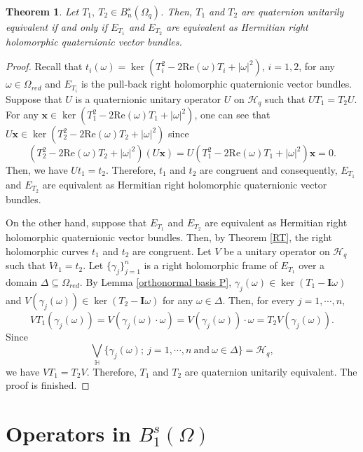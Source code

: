 \documentclass[pdflatex,sn-mathphys-num]{sn-jnl}%
\theoremstyle{thmstyleone}%
\newtheorem{theorem}{Theorem}%
\theoremstyle{thmstyletwo}%
\theoremstyle{thmstylethree}%
\newtheorem{theorem}{Theorem}[section]
\theoremstyle{definition}
\theoremstyle{remark}
\begin{document}
    \begin{theorem}\label{MT}
	Let $T_1,\ T_2\in B_n^{s}(\Omega_q)$. Then, $T_1$ and $T_2$ are quaternion unitarily equivalent if and only if $E_{T_1}$ and $E_{T_2}$ are equivalent as Hermitian right holomorphic quaternionic vector bundles.
	\end{theorem}
    \begin{proof}
    Recall that $t_i(\omega)=\ker(T_i^2-2\mathrm{Re}(\omega)T_i+|\omega|^2)$, $i=1, 2$, for any $\omega\in\Omega_{red}$ and $E_{T_i}$ is the pull-back right holomorphic quaternionic vector bundles. Suppose that $U$ is a  quaternionic unitary operator $U$ on $\mathcal{H}_q$ such that
    $UT_1=T_2U$. For any $\boldsymbol{x}\in\ker(T_1^2-2\mathrm{Re}(\omega)T_1+|\omega|^2)$, one can see that $U\boldsymbol{x}\in\ker(T_2^2-2\mathrm{Re}(\omega)T_2+|\omega|^2)$ since
    $$
     (T_2^2-2\mathrm{Re}(\omega)T_2+|\omega|^2)(U\boldsymbol{x})
    =  U(T_1^2-2\mathrm{Re}(\omega)T_1+|\omega|^2)\boldsymbol{x}
    =  0.
    $$
    Then, we have $Ut_1=t_2$. Therefore, $t_1$ and $t_2$ are congruent and consequently, $E_{T_1}$ and $E_{T_2}$ are equivalent as Hermitian right holomorphic quaternionic vector bundles.


    On the other hand, suppose that $E_{T_1}$ and $E_{T_2}$ are equivalent as Hermitian right holomorphic quaternionic vector bundles. Then, by Theorem \ref{RT}, the right holomorphic curves $t_1$ and $t_2$ are congruent. Let $V$ be a unitary operator on $\mathcal{H}_q$ such that $Vt_1=t_2$. Let
    $\{\gamma_j\}_{j=1}^n$ is a right holomorphic frame of $E_{T_1}$ over a domain $\Delta\subseteq\Omega_{red}$.
    By Lemma \ref{orthonormal basis P}, $\gamma_j(\omega)\in \ker(T_1-\boldsymbol{I}\omega)$ and $V(\gamma_j(\omega))\in \ker(T_2-\boldsymbol{I}\omega)$ for any $\omega\in\Delta$.
    Then, for every $j=1, \cdots, n$,
       $$
       VT_1(\gamma_{j}(\omega))=V(\gamma_{j}(\omega)\cdot \omega)=V(\gamma_{j}(\omega))\cdot \omega=T_2V(\gamma_{j}(\omega)).
       $$
    Since
    \[
    \bigvee\limits_{\mathbb{H}}\{ \gamma_j(\omega); \ j=1, \cdots, n \ \text{and} \ \omega\in\Delta\}=\mathcal{H}_q,
    \]
    we have $VT_1=T_2V$. Therefore, $T_1$ and $T_2$ are quaternion unitarily equivalent. The proof is finished.
    \end{proof}


\section{Operators in $B_1^{s}(\Omega)$}
\end{document}
